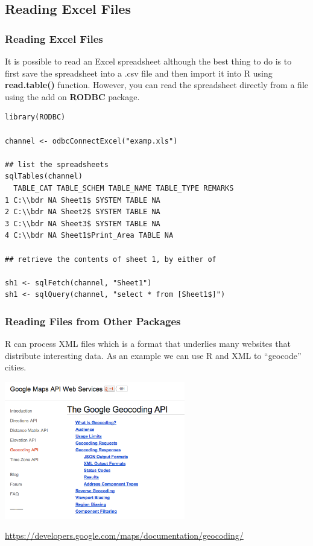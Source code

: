 \documentclass{beamer}
\begin{document}
\subsection{Reading Excel Files}
\begin{frame}[fragile]
\frametitle{Reading Excel Files}
It is possible to read an Excel spreadsheet although the best thing to do is to first save the spreadsheet into a .csv file and then import it into R using \textbf{read.table()} function.
However, you can read the spreadsheet directly from a file using the add on \textbf{RODBC} package.
\footnotesize
\begin{verbatim}
library(RODBC)

channel <- odbcConnectExcel("examp.xls")

## list the spreadsheets
sqlTables(channel)
  TABLE_CAT TABLE_SCHEM TABLE_NAME TABLE_TYPE REMARKS
1 C:\\bdr NA Sheet1$ SYSTEM TABLE NA
2 C:\\bdr NA Sheet2$ SYSTEM TABLE NA
3 C:\\bdr NA Sheet3$ SYSTEM TABLE NA
4 C:\\bdr NA Sheet1$Print_Area TABLE NA

## retrieve the contents of sheet 1, by either of

sh1 <- sqlFetch(channel, "Sheet1")
sh1 <- sqlQuery(channel, "select * from [Sheet1$]")
\end{verbatim}
\end{frame}


\begin{frame}[fragile]
\frametitle{Reading Files from Other Packages}
R can process XML files which is a format that underlies many websites that distribute interesting data. As an example we can use R and XML to ``geocode'' cities. 
\footnotesize
\begin{center}
\includegraphics[height=6cm]{../IMG/geocode.png}
\end{center}
\scriptsize
\url{https://developers.google.com/maps/documentation/geocoding/}
\end{frame}
\end{document}
